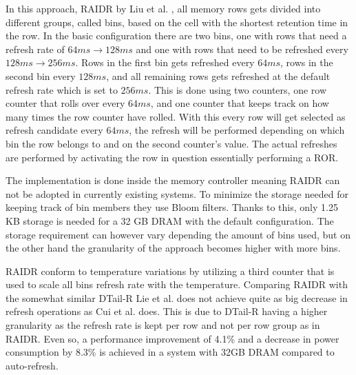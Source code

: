In this approach, RAIDR by Liu et al. \cite{raidr}, all memory rows gets divided into different groups, called bins, based on the cell with the shortest retention time in the row. In the basic configuration there are two bins, one with rows that need a refresh rate of $64ms \to 128ms$ and one with rows that need to be refreshed every $128ms \to 256ms$. Rows in the first bin gets refreshed every $64ms$, rows in the second bin every $128ms$, and all remaining rows gets refreshed at the default refresh rate which is set to $256ms$. This is done using two counters, one row counter that rolls over every $64ms$, and one counter that keeps track on how many times the row counter have rolled. With this every row will get selected as refresh candidate every $64ms$, the refresh will be performed depending on which bin the row belongs to and on the second counter's value. The actual refreshes are performed by activating the row in question essentially performing a ROR.

The implementation is done inside the memory controller meaning RAIDR can not be adopted in currently existing systems. To minimize the storage needed for keeping track of bin members they use Bloom filters. Thanks to this, only 1.25 KB storage is needed for a 32 GB DRAM with the default configuration. The storage requirement can however vary depending the amount of bins used, but on the other hand the granularity of the approach becomes higher with more bins. 

RAIDR conform to temperature variations by utilizing a third counter that is used to scale all bins refresh rate with the temperature. Comparing RAIDR with the somewhat similar DTail-R Lie et al. does not achieve quite as big decrease in refresh operations as Cui et al. does. This is due to DTail-R having a higher granularity as the refresh rate is kept per row and not per row group as in RAIDR. Even so, a performance improvement of 4.1\% and a decrease in power consumption by 8.3\% is achieved in a system with 32GB DRAM compared to auto-refresh.